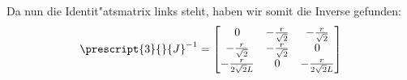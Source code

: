 \documentclass[11pt]{article}
\begin{document}
    Da nun die Identit"atsmatrix links steht, haben wir somit die Inverse gefunden:
    \begin{equation}
        \prescript{3}{}{J}^{-1} =
        \begin{bmatrix}
            0 & -\frac{r}{\sqrt{2}} & -\frac{r}{\sqrt{2}} \\
            -\frac{r}{\sqrt{2}} & -\frac{r}{\sqrt{2}} & 0 \\
            -\frac{r}{2\sqrt{2}L} & 0 & -\frac{r}{2\sqrt{2}L} \\
        \end{bmatrix}\label{eq:finallydone}
    \end{equation}
\end{document}
